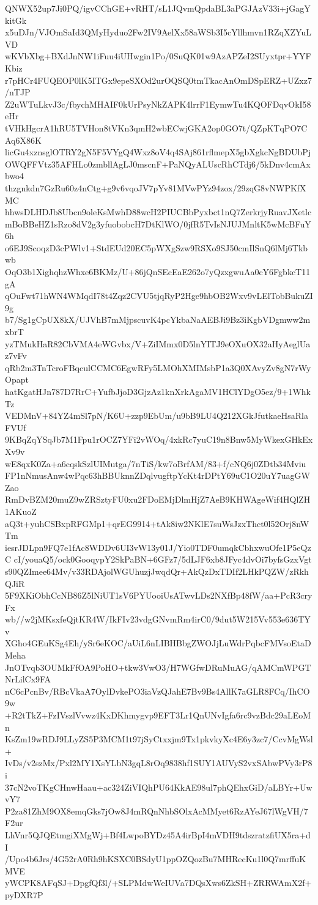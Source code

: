 QNWX52up7Ji0PQ/igvCChGE+vRHT/sL1JQvmQpdaBL3aPGJAzV33i+jGagYkitGk
x5uDJn/VJOmSaId3QMyHyduo2Fw2IV9AelXx58aWSb3I5cYllhmvn1RZqXZYuLVD
wKVbXbg+BXdJnNW1iFuu4iUHwgin1Po/0SuQK01w9AzAPZeI2SUyxtpr+YYFKbiz
r7pHCr4FUQEOP0lK5ITGx9epeSXOd2urOQSQ0tmTkacAnOmDSpERZ+UZxz7/nTJP
Z2uWTuLkvJ3c/fbychMHAIF0kUrPsyNkZAPK4lrrF1EymwTu4KQOFDqvOkI58eHr
tVHkHgcrA1hRU5TVHon8tVKn3qmH2wbECwjGKA2op0GO7t/QZpKTqPO7CAq6X86K
licGu4xznsglOTRY2gN5F5VYgQ4Wxz8oV4q4SAj861rflmepX5gbXgkcNgBDUbPj
OWQFFVtz35AFHLo0zmbllAgLJ0mscnF+PaNQyALUscRhCTdj6/5kDnv4cmAxbwo4
thzgnkdn7GzRu60z4nCtg+g9v6vqoJV7pYv81MVwPYz94zox/29zqG8vNWPKfXMC
hhwsDLHDJb8Ubcn9oleKsMwhD88wcH2PIUCBbPyxbct1nQ7ZerkrjyRuavJXetlc
mBoBBeHZ1sRzo8dV2g3yfuobobcH7DtKlWO/0jfR5TvIsNJUJMnltK5wMcBFuY6h
o6EJ9ScoqzD3cPWlv1+StdEUd20EC5pWXgSzw9RSXo9SJ50cmIlSnQ6lMj6Tkbwb
OqO3b1XighqhzWhxe6BKMz/U+86jQnSEcEaE262o7yQzxgwuAa0cY6FgbkcT11gA
qOuFwt71hWN4WMqdI78t4Zqz2CVU5tjqRyP2Hge9hbOB2Wxv9vLElTobBukuZI9g
b7/Sg1gCpUX8kX/UJVhB7mMjpscuvK4pcYkbaNaAEBJi9Bz3iKgbVDgmww2mxbrT
yzTMukHaR82CbVMA4eWGvbx/V+ZiIMmx0D5lnYITJ9eOXuOX32aHyAeglUaz7vFv
qRb2m3TnTcroFBqculCCMC6EgwRFy5LMOhXMIMsbP1a3Q0XAvyZv8gN7rWyOpapt
hatKgatHJn787D7RrC+YufbJjoD3GjzAz1knXrkAgaMV1HClYDgO5ez/9+1WhkTz
VEDMnV+84YZ4mSl7pN/K6U+zzp9EbUm/u9bB9LU4Q212XGkJfutkaeHsaRlaFVUf
9KBqZqYSqJb7M1Fpu1rOCZ7YFi2vWOq/4xkRc7yuC19n8Bnw5MyWkexGHkExXv9v
wE8qxK0Za+a6cqskSzlUIMutga/7nTiS/kw7oBrfAM/83+f/cNQ6j0ZDtb34Mviu
FP1nNmusAnw4wPqc63hBBUknnZDqlvugftpYcKt4rDPtY69uC1O20uY7uagGWZao
RmDvBZM20muZ9wZRSztyFU0xu2FDoEMjDlmHjZ7AeB9KHWAgeWif4HQlZH1AKuoZ
aQ3t+yuhCSBxpRFGMp1+qrEG9914+tAk8iw2NKlE7suWsJzxThct0l52Orj8nWTm
iesrJDLpn9FQ7e1fAc8WDDv6UI3vW13y01J/Yio0TDF0umqkCbhxwuOfe1P5eQzC
cI/youaQ5/ock0GooqypY2SkPaBN+6GFz7/5dLJF6xb8JFyc4dvOi7byfsGzxVgt
s90QZImee64Mv/v33RDAjolWGUhuzjJwqdQr+AkQzDxTDIf2LHkPQZW/zRkhQJiR
5F9XKiObhCcNB86Z5lNiUT1sV6PYUooiUsATwvLDs2NXfBp48fW/aa+PcR3cryFx
wb//w2jMKsxfeQjtKR4W/IkFIv23vdgGNvmRm4irC0/9dut5W215Vv553e636TYv
XGho4GEuKSg4Eh/ySr6eKOC/aUiL6nLIBHBbgZWOJjLuWdrPqbcFMVsoEtaDMeha
JnOTvqb3OUMkFfOA9PoHO+tkw3VwO3/H7WGfwDRuMuAG/qAMCmWPGTNrLilCx9FA
nC6cPcnBv/RBcVkaA7OylDvkePO3iaVzQJahE7Bv9Bs4AllK7aGLR8FCq/IhCO9w
+R2tTkZ+FzIVszlVvwz4KxDKhmygvp9EFT3Lr1QnUNvIgfa6rc9vzBdc29aLEoMn
KsZm19wRDJ9LLyZS5P3MCM1t97jSyCtxxjm9Tx1pkvkyXc4E6y3zc7/CcvMgWsl+
IvDs/v2szMx/Pxl2MY1XsYLbN3gqL8rOq9838hf1SUY1AUVyS2vxSAbwPVy3rP8i
37cN2voTKgCHnwHaau+ac324ZiVIQhPU64KkAE98ul7phQEhxGiD/aLBYr+UwvY7
P2za81ZhM9OX8emqGks7jOw8J4mRQnNhbSOlxAcMMyet6RzAYeJ67lWgVH/7F2ur
LhVnr5QJQEtmgiXMgWj+Bf4LwpoBYDz45A4irBpI4mVDH9tdszratzfiUX5ra+dI
/Upo4b6Jrs/4G52rA0Rh9hKSXC0BSdyU1ppOZQozBu7MHRecKu1l0Q7mrffuKMVE
yWCPK8AFqSJ+DpgfQf3l/+SLPMdwWeIUVa7DQsXws6ZkSH+ZRRWAmX2f+pyDXR7P

